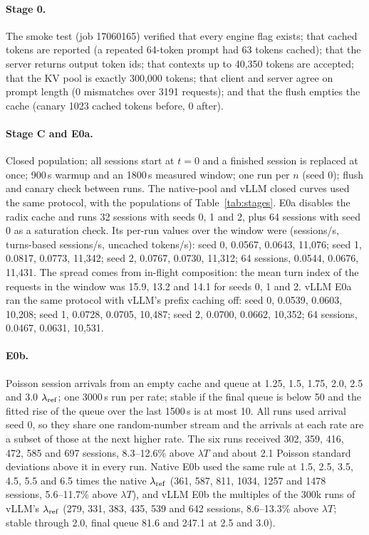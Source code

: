 \paragraph{Stage 0.} The smoke test (job 17060165) verified that every engine flag exists; that cached tokens are reported (a repeated 64-token prompt had 63 tokens cached); that the server returns output token ids; that contexts up to 40,350 tokens are accepted; that the KV pool is exactly 300,000 tokens; that client and server agree on prompt length (0 mismatches over 3191 requests); and that the flush empties the cache (canary 1023 cached tokens before, 0 after).

\paragraph{Stage C and E0a.} Closed population; all sessions start at $t=0$ and a finished session is replaced at once; 900\,s warmup and an 1800\,s measured window; one run per $n$ (seed 0); flush and canary check between runs. The native-pool and vLLM closed curves used the same protocol, with the populations of Table~\ref{tab:stages}. E0a disables the radix cache and runs 32 sessions with seeds 0, 1 and 2, plus 64 sessions with seed 0 as a saturation check. Its per-run values over the window were (sessions/s, turns-based sessions/s, uncached tokens/s): seed 0, 0.0567, 0.0643, 11,076; seed 1, 0.0817, 0.0773, 11,342; seed 2, 0.0767, 0.0730, 11,312; 64 sessions, 0.0544, 0.0676, 11,431. The spread comes from in-flight composition: the mean turn index of the requests in the window was 15.9, 13.2 and 14.1 for seeds 0, 1 and 2. vLLM E0a ran the same protocol with vLLM's prefix caching off: seed 0, 0.0539, 0.0603, 10,208; seed 1, 0.0728, 0.0705, 10,487; seed 2, 0.0700, 0.0662, 10,352; 64 sessions, 0.0467, 0.0631, 10,531.

\paragraph{E0b.} Poisson session arrivals from an empty cache and queue at 1.25, 1.5, 1.75, 2.0, 2.5 and 3.0 $\lambda_{\mathrm{ref}}$; one 3000\,s run per rate; stable if the final queue is below 50 and the fitted rise of the queue over the last 1500\,s is at most 10. All runs used arrival seed 0, so they share one random-number stream and the arrivals at each rate are a subset of those at the next higher rate. The six runs received 302, 359, 416, 472, 585 and 697 sessions, 8.3--12.6\% above $\lambda T$ and about 2.1 Poisson standard deviations above it in every run. Native E0b used the same rule at 1.5, 2.5, 3.5, 4.5, 5.5 and 6.5 times the native $\lambda_{\mathrm{ref}}$ (361, 587, 811, 1034, 1257 and 1478 sessions, 5.6--11.7\% above $\lambda T$), and vLLM E0b the multiples of the 300k runs of vLLM's $\lambda_{\mathrm{ref}}$ (279, 331, 383, 435, 539 and 642 sessions, 8.6--13.3\% above $\lambda T$; stable through 2.0, final queue 81.6 and 247.1 at 2.5 and 3.0).

